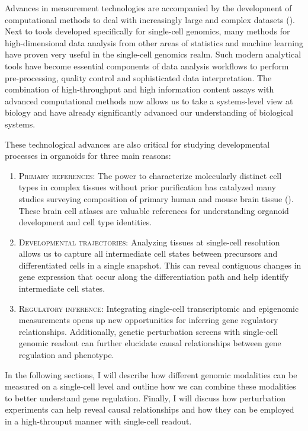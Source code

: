 Advances in measurement technologies are accompanied by the development of computational methods to deal with increasingly large and complex datasets (\cite{zappia_exploring_2018}). Next to tools developed specifically for single-cell genomics, many methods for high-dimensional data analysis from other areas of statistics and machine learning have proven very useful in the single-cell genomics realm. Such modern analytical tools have become essential components of data analysis workflows to perform pre-processing, quality control and sophisticated data interpretation. The combination of high-throughput and high information content assays with advanced computational methods now allows us to take a systems-level view at biology and have already significantly advanced our understanding of biological systems.

These technological advances are also critical for studying developmental processes in organoids for three main reasons:

\begin{enumerate}
    \item {\scshape Primary references}: The power to characterize molecularly distinct cell types in complex tissues without prior purification has catalyzed many studies surveying composition of primary human and mouse brain tissue (\cite{la_manno_molecular_2021,zeisel_molecular_2018,polioudakis_single-cell_2019,mayer_developmental_2018}). These brain cell atlases are valuable references for understanding organoid development and cell type identities.
    \item {\scshape Developmental trajectories}: Analyzing tissues at single-cell resolution allows us to capture all intermediate cell states between precursors and differentiated cells in a single snapshot. This can reveal contiguous changes in gene expression that occur along the differentiation path and help identify intermediate cell states. 
    \item {\scshape Regulatory inference}: Integrating single-cell transcriptomic and epigenomic measurements opens up new opportunities for inferring gene regulatory relationships. Additionally, genetic perturbation screens with single-cell genomic readout can further elucidate causal relationships between gene regulation and phenotype.
  \end{enumerate}

In the following sections, I will describe how different genomic modalities can be measured on a single-cell level and outline how we can combine these modalities to better understand gene regulation. Finally, I will discuss how perturbation experiments can help reveal causal relationships and how they can be employed in a high-throuput manner with single-cell readout.


